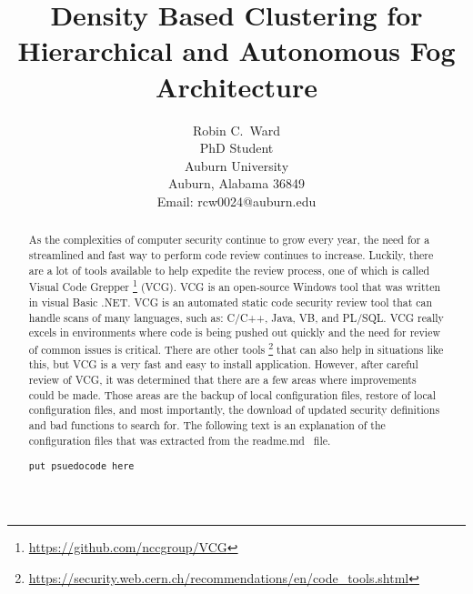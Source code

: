 \documentclass[letterpaper,twocolumn,10pt]{article}
\begin{document}

\date{}

\title{\Large \bf Density Based Clustering for Hierarchical and Autonomous Fog Architecture}

\author{
{\rm Robin C.\ Ward}\\
PhD Student\\
Auburn University\\
Auburn, Alabama 36849\\
Email: rcw0024@auburn.edu\\
} %

\maketitle

\begin{abstract}
As the complexities of computer security continue to grow every year, the need for a streamlined and fast way to perform code review continues to increase. Luckily, there are a lot of tools available to help expedite the review process, one of which is called  Visual Code Grepper%
\footnote{\url{https://github.com/nccgroup/VCG}} (VCG). VCG is an open-source Windows tool that was written in visual Basic .NET. VCG is an automated static code security review tool that can handle scans of many languages, such as: C/C++, Java, VB, and PL/SQL. VCG really excels in environments where code is being pushed out quickly and the need for review of common issues is critical. There are other tools%
\footnote{\url{https://security.web.cern.ch/recommendations/en/code_tools.shtml}} that can also help in situations like this, but VCG is a very fast and easy to install application. However, after careful review of VCG, it was determined that there are a few areas where improvements could be made. Those areas are the backup of local configuration files, restore of local configuration files, and most importantly, the download of updated security definitions and bad functions to search for. The following text is an explanation of the configuration files that was extracted from the readme.md~\cite{vcg} file.

\begin{verbatim}
put psuedocode here
\end{verbatim}

\end{abstract}
\end{document}
